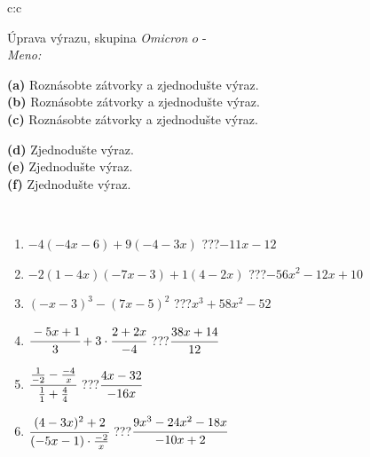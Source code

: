 \documentclass[10pt]{report}
\newcommand\omicron{o}
\begin{document}
\newpage
\thispagestyle{empty}
\begin{tabular}{c:c}
\begin{minipage}[c][104.5mm][t]{0.5\linewidth}
\begin{center}
\vspace{7mm}
{\huge Úprava výrazu, skupina \textit{Omicron $\omicron$} -}\\[5mm]
\textit{Meno:}\phantom{xxxxxxxxxxxxxxxxxxxxxxxxxxxxxxxxxxxxxxxxxxxxxxxxxxxxxxxxxxxxxxxxx}\\[5mm]
\begin{minipage}{0.95\linewidth}
\begin{center}
{\small \begin{minipage}{0.6\textwidth}
\textbf{(a)} Roznásobte zátvorky a zjednodušte výraz. \\[1mm]
\textbf{(b)} Roznásobte zátvorky a zjednodušte výraz. \\[1mm]
\textbf{(c)} Roznásobte zátvorky a zjednodušte výraz.
\end{minipage} \begin{minipage}{0.39\textwidth}
\textbf{(d)} Zjednodušte výraz. \\[1mm]
\textbf{(e)} Zjednodušte výraz. \\[1mm]
\textbf{(f)} Zjednodušte výraz.
\end{minipage}
}
\end{center}
\end{minipage}
\\[4mm]
\begin{minipage}{0.79\linewidth}
\begin{center}
\begin{varwidth}{\linewidth}
\begin{enumerate}
\normalsize
\item $-4(-4x-6)+9(-4-3x)$\quad \dotfill\; ???\;\dotfill \quad $-11x-12$
\item $-2(1-4x)(-7x-3)+1(4-2x)$\quad \dotfill\; ???\;\dotfill \quad $-56x^2-12x+10$
\item $(-x-3)^3-(7x-5)^2$\quad \dotfill\; ???\;\dotfill \quad $x^3+58x^2-52$
\item $\cfrac{-5x+1}{3}+3\cdot\cfrac{2+2x}{-4}$\quad \dotfill\; ???\;\dotfill \quad $\cfrac{38x+14}{12}$
\item $\cfrac{\frac{1}{-2}-\frac{-4}{x}}{\frac{1}{1}+\frac{4}{4}}$\quad \dotfill\; ???\;\dotfill \quad $\cfrac{4x-32}{-16x}$
\item $\cfrac{(4-3x)^2+2}{(-5x-1)\cdot\frac{-2}{x}}$\quad \dotfill\; ???\;\dotfill \quad $\cfrac{9x^3-24x^2-18x}{-10x+2}$

\end{enumerate}
\end{varwidth}
\end{center}
\end{minipage}
\end{center}
\end{minipage}
\end{tabular}
\end{document}
